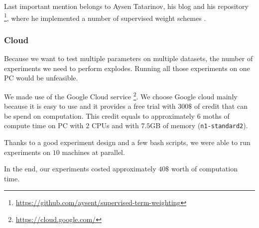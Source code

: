     Last important mention belongs to Aysen Tatarinov, his blog and his repository \footnote{\url{https://github.com/aysent/supervised-term-weighting}}, where he implemented a number of supervised weight schemes \cite{maas2011learning}.
    \* %
    
    
    \subsubsection{Cloud} 
    Because we want to test multiple parameters on multiple datasets, the number of experiments we need to perform explodes.
    Running all those experiments on one PC would be unfeasible.
    
    We made use of the Google Cloud service \footnote{\url{https://cloud.google.com/}}.
    We choose Google cloud mainly because it is easy to use and it provides a free trial with $300\$$ of credit that can be spend on computation. 
    This credit equals to approximately $6$ moths of compute time on PC with $2$ CPUs and with $7.5$GB of memory (\texttt{n1-standard2}).
    
    Thanks to a good experiment design and a few bash scripts,
    we were able to run experiments on $10$ machines at parallel.
    
    
    In the end, our experiments costed approximately $40\$$ worth of computation time.
    